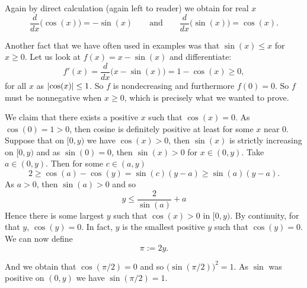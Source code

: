Again by direct calculation (again left to reader) we obtain
for real $x$
\begin{equation*}
\frac{d}{dx} \bigl( \cos(x) \bigr) = -\sin(x)
\qquad \text{and} \qquad
\frac{d}{dx} \bigl( \sin(x) \bigr) = \cos(x) .
\end{equation*}

Another fact that we have often used in examples was that $\sin(x) \leq x$
for $x \geq 0$.  Let us look at
$f(x) = x-\sin(x)$ and differentiate:
\begin{equation*}
f'(x) = \frac{d}{dx} \bigl( x - \sin(x) \bigr)
=
1 -\cos(x) \geq 0 ,
\end{equation*}
for all $x$ as $\lvert {\cos(x)} \rvert \leq 1$.
So $f$ is nondecreasing and
furthermore $f(0) = 0$.  So $f$ must be nonnegative when $x \geq 0$, which is
precisely what we wanted to prove.

We claim that there exists a positive $x$ such that $\cos(x) = 0$.
As $\cos(0) = 1 > 0$, then cosine is definitely positive at least
for some $x$ near 0.
Suppose that on $[0,y)$ we have $\cos(x) > 0$, then $\sin(x)$ is strictly
increasing on $[0,y)$ and as $\sin(0) = 0$, then
$\sin(x) > 0$ for $x \in (0,y)$.  Take $a \in (0,y)$.  Then
for some $c \in (a,y)$
\begin{equation*}
2 \geq \cos(a)-\cos(y) = \sin(c)(y-a) \geq \sin(a)(y-a) .
\end{equation*}
As $a > 0$, then $\sin(a) > 0$ and so
\begin{equation*}
y \leq \frac{2}{\sin(a)} + a
\end{equation*}
Hence there is some largest $y$ such that $\cos(x) > 0$ in $[0,y)$.  By
continuity, for that $y$,
$\cos(y) = 0$.
In fact, $y$ is the
smallest positive $y$ such that $\cos(y) = 0$.  We can now define
\begin{equation*}
\pi := 2y .
\end{equation*}

And we obtain that $\cos(\pi/2) = 0$ and so $\bigl(\sin(\pi/2)\bigr)^2 = 1$.
As $\sin$ was positive on $(0,y)$ we have
$\sin(\pi/2) = 1$.

